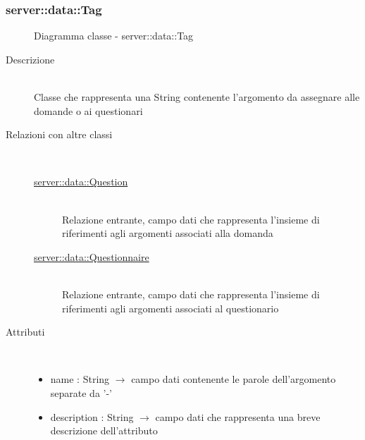 \subsubsection[Tag]{server::data::Tag}
\begin{figure}[H]
	\centering
	\caption{Diagramma classe - server::data::Tag}
\end{figure}\begin{description}
\item[Descrizione] \hfill \\
Classe che rappresenta una String contenente l'argomento da assegnare alle domande o ai questionari
\item[Relazioni con altre classi] \hfill \\
\vspace{-7mm}
\begin{description}
	\item[\hyperlink{server::data::Question}{server::data::Question}] \hfill \\
	Relazione entrante, campo dati che rappresenta l'insieme di riferimenti agli argomenti associati alla domanda
	\item[\hyperlink{server::data::Questionnaire}{server::data::Questionnaire}] \hfill \\
	Relazione entrante, campo dati che rappresenta l'insieme di riferimenti agli argomenti associati al questionario
\end{description}

\item[Attributi] \hfill \\
\vspace{-7mm}
\begin{itemize}
	\item name : String $\rightarrow$ campo dati contenente le parole dell'argomento separate da '-'
	\item description : String $\rightarrow$ campo dati che rappresenta una breve descrizione dell'attributo
\end{itemize}


\end{description}

